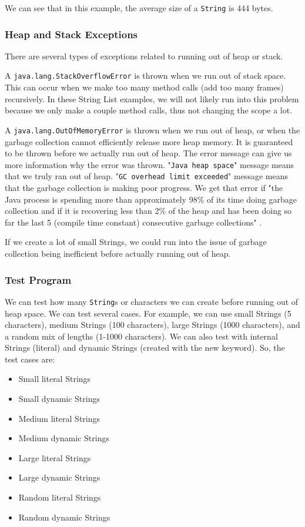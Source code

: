 We can see that in this example, the average size of a \texttt{String} is 444 bytes.

\subsubsection{Heap and Stack Exceptions}
There are several types of exceptions related to running out of heap or stack.

A \texttt{java.lang.StackOverflowError} is thrown when we run out of stack space. This can occur when we make too many method calls (add too many frames) recursively. In these String List examples, we will not likely run into this problem because we only make a couple method calls, thus not changing the scope a lot.

A \texttt{java.lang.OutOfMemoryError} is thrown when we run out of heap, or when the garbage collection cannot efficiently release more heap memory. It is guaranteed to be thrown before we actually run out of heap. The error message can give us more information why the error was thrown. "\texttt{Java heap space}" message means that we truly ran out of heap. "\texttt{GC overhead limit exceeded}" message means that the garbage collection is making poor progress. We get that error if "the Java process is spending more than approximately 98\% of its time doing garbage collection and if it is recovering less than 2\% of the heap and has been doing so far the last 5 (compile time constant) consecutive garbage collections" \cite{gosling}.

If we create a lot of small Strings, we could run into the issue of garbage collection being inefficient before actually running out of heap.

\subsubsection{Test Program}
We can test how many \texttt{String}s or characters we can create before running out of heap space. We can test several cases. For example, we can use small Strings (5 characters), medium Strings (100 characters), large Strings (1000 characters), and a random mix of lengths (1-1000 characters). We can also test with internal Strings (literal) and dynamic Strings (created with the new keyword). So, the test cases are:
\begin{itemize}
\item Small  literal Strings
\item Small dynamic Strings
\item Medium literal Strings
\item Medium dynamic Strings
\item Large literal Strings
\item Large dynamic Strings
\item Random literal Strings
\item Random dynamic Strings
\end{itemize}

